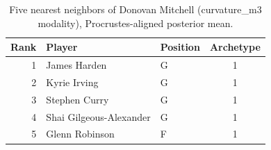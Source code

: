 \begin{table}[htbp]
  \centering\small
  \begin{tabular}{rllc}
    \toprule
    Rank & Player & Position & Archetype \\
    \midrule
    1 & James Harden & G & 1 \\
    2 & Kyrie Irving & G & 1 \\
    3 & Stephen Curry & G & 1 \\
    4 & Shai Gilgeous-Alexander & G & 1 \\
    5 & Glenn Robinson & F & 1 \\
    \bottomrule
  \end{tabular}
  \caption{Five nearest neighbors of Donovan Mitchell (curvature_m3 modality), Procrustes-aligned posterior mean.}
  \label{tab:Donovan_Mitchell_neighbors_curvature_m3}
\end{table}

